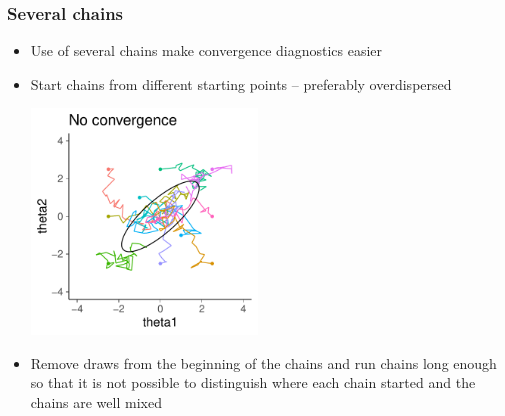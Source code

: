 \documentclass[10pt,handout]{beamer}
\begin{document}
\begin{frame}

\frametitle{ Several chains}

  \vspace{-0.5\baselineskip}
  \begin{itemize}
  \item Use of several chains make convergence diagnostics easier
    \item Start chains from different starting points -- preferably overdispersed
      \begin{center}
  \vspace{-0.5\baselineskip}
      \includegraphics[width=6cm]{figs/10chains1.pdf}
    \end{center}
  \vspace{-0.5\baselineskip}
    \item<2-> Remove draws from the beginning of the chains and run
      chains long enough so that it is not possible to distinguish
      where each chain started and the chains are well mixed
  \end{itemize}

\end{frame}
\end{document}

